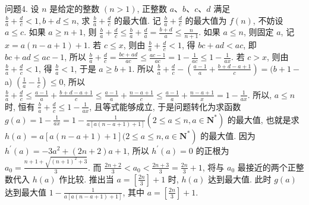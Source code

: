 问题4. 设 $n$ 是给定的整数 $(n>1)$, 正整数 $a 、 b 、 c 、 d$ 满足 $\frac{b}{a}+\frac{d}{c}<1, b+ d \leqslant n$, 求 $\frac{b}{a}+\frac{d}{c}$ 的最大值.
记 $\frac{b}{a}+\frac{d}{c}$ 的最大值为 $f(n)$, 不妨设 $a \leqslant c$. 如果 $a \geqslant n+1$, 则 $\frac{b}{a}+\frac{d}{c} \leqslant \frac{b}{a}+\frac{d}{a}=\frac{b+d}{a} \leqslant \frac{n}{n+1}$. 如果 $a \leqslant n$, 则固定 $a$, 记 $x=a(n-a+1)+1$. 若 $c \leqslant x$, 则由 $\frac{b}{a}+\frac{d}{c}<1$, 得 $b c+a d<a c$, 即 $b c+a d \leqslant a c-1$, 所以 $\frac{b}{a}+\frac{d}{c}= \frac{b c+a d}{a c} \leqslant \frac{a c-1}{a c}=1-\frac{1}{a c} \leqslant 1-\frac{1}{a x}$. 若 $c>x$, 则由 $\frac{b}{a}+\frac{d}{c}<1$, 得 $\frac{b}{a}<1$, 于是 $a \geqslant b+1$. 所以 $\frac{b}{a}+\frac{d}{c}-\left(\frac{a-1}{a}+\frac{b+d-a+1}{c}\right)=(b+1-$ a) $\left(\frac{1}{a}-\frac{1}{c}\right) \leqslant 0$, 所以 $\frac{b}{a}+\frac{d}{c} \leqslant \frac{a-1}{a}+\frac{b+d-a+1}{c} \leqslant \frac{a-1}{a}+\frac{n-a+1}{c} \leqslant \frac{a-1}{a}+\frac{n-a+1}{x}=1-\frac{1}{a x}$. 所以, $a \leqslant n$ 时, 恒有 $\frac{b}{a}+\frac{d}{c} \leqslant 1-\frac{1}{a x}$, 且等式能够成立, 于是问题转化为求函数 $g(a)=1-\frac{1}{a x}=1-\frac{1}{a[a(n-a+1)+1]} \left(2 \leqslant a \leqslant n, a \in \mathbf{N}^*\right)$ 的最大值, 也就是求 $h(a)=a[a(n-a+1)+1](2 \leqslant \left.a \leqslant n, a \in \mathbf{N}^*\right)$ 的最大值.
因为 $h^{\prime}(a)=-3 a^2+(2 n+2) a+1$, 所以 $h^{\prime}(a)=0$ 的正根为 $a_0=\frac{n+1+\sqrt{(n+1)^2+3}}{3}$. 而 $\frac{2 n+2}{3}<a_0<\frac{2 n+3}{3}=\frac{2 n}{3}+1$, 将与 $a_0$ 最接近的两个正整数代入 $h(a)$ 作比较.
推出当 $a=\left[\frac{2 n}{3}\right]+1$ 时, $h(a)$ 达到最大值.
此时 $g(a)$ 达到最大值 $1-\frac{1}{a[a(n-a+1)+1]}$, 其中 $a=\left[\frac{2 n}{3}\right]+1$.


